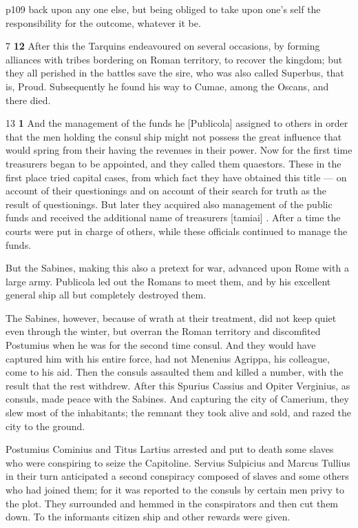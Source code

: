 p109 back upon any one else, but being obliged to take upon one's self the responsibility for the outcome, whatever it be.

7 \textbf{12} After this the Tarquins endeavoured on several occasions, by forming alliances with tribes bordering on Roman territory, to recover the kingdom; but they all perished in the battles save the sire, who was also called Superbus, that is, Proud. Subsequently he found his way to Cumae, among the Oscans, and there died.

13
\textbf{1} And the management of the funds he [Publicola] assigned to others in order that the men holding the consul ­ship might not possess the great influence that would spring from their having the revenues in their power. Now for the first time treasurers began to be appointed, and they called them quaestors. These in the first place tried capital cases, from which fact they have obtained this title \texthebrew{—} on account of their questionings and on account of their search for truth as the result of questionings. But later they acquired also management of the public funds and received the additional name of treasurers [tamiai] . After a time the courts were put in charge of others, while these officials continued to manage the funds.

But the Sabines, making this also a pretext for war, advanced upon Rome with a large army. Publicola led out the Romans to meet them, and by his excellent general ­ship all but completely destroyed them.

The Sabines, however, because of wrath at their treatment, did not keep quiet even through the winter, but overran the Roman territory and discomfited Postumius when he was for the second time consul. And they would have captured him with his entire force, had not Menenius Agrippa, his colleague, come to his aid. Then the consuls assaulted them and killed a number, with the result that the rest withdrew. After this Spurius Cassius and Opiter Verginius, as consuls, made peace with the Sabines. And capturing the city of Camerium, they slew most of the inhabitants; the remnant they took alive and sold, and razed the city to the ground.

Postumius Cominius and Titus Lartius arrested and put to death some slaves who were conspiring to seize the Capitoline. Servius Sulpicius and Marcus Tullius in their turn anticipated a second conspiracy composed of slaves and some others who had joined them; for it was reported to the consuls by certain men privy to the plot. They surrounded and hemmed in the conspirators and then cut them down. To the informants citizen ­ship and other rewards were given.

